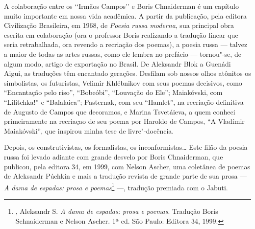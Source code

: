 A colaboração entre os ``Irmãos Campos'' e Boris Chnaiderman é um
capítulo muito importante em nossa vida acadêmica. A partir da
publicação, pela editora Civilização Brasileira, em 1968, de
\emph{Poesia russa moderna}, sua principal obra escrita em colaboração
(ora o professor Boris realizando a tradução linear que seria
retrabalhada, ora revendo a recriação dos poemas), a poesia russa ---
talvez a maior de todas as artes russas, como ele lembra no prefácio ---
tornou"-se, de algum modo, artigo de exportação no Brasil. De Aleksandr
Blok a Guenádi Aigui, as traduções têm encantado gerações. Desfilam sob
nossos olhos atônitos os simbolistas, os futuristas, Velimir Khlébnikov
com seus poemas decisivos, como ``Encantação pelo riso'', ``Bobeóbi'',
``Louvação do Ele''; Maiakóvski, com ``Lílitchka!'' e ``Balalaica'';
Pasternak, com seu ``Hamlet'', na recriação definitiva de Augusto de
Campos que decoramos, e Marina Tsvetáieva, a quem conheci primeiramente
na recriaçao de seu poema por Haroldo de Campos, ``A Vladímir
Maiakóvski'', que inspirou minha tese de livre"-docência.

Depois, os construtivistas, os formalistas, os inconformistas\ldots{} Este
filão da poesia russa foi levado adiante com grande desvelo por Boris
Chnaiderman, que publicou, pela editora 34, em 1999, com Nelson Ascher,
uma coletânea de poemas de Aleksandr Púchkin e mais a tradução revista
de grande parte de sua prosa --- \emph{A dama de espadas: prosa e
poemas}\footnote{, Aleksandr S. \emph{A dama de espadas: prosa e
  poemas}. Tradução Boris Schnaiderman e Nelson Ascher. 1ª ed. São
  Paulo: Editora 34, 1999.} ---, tradução premiada com o Jabuti.

